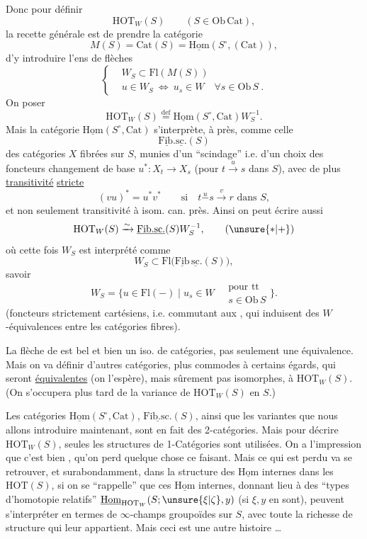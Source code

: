 Donc pour définir
\[
\mathrm{HOT}_W(S)\qquad (S\in\mathrm{Ob}\,\mathrm{Cat}),
\]
la recette générale est de prendre la catégorie
\[
M(S)=\mathrm{Cat}(S)=\underline{\mathrm{Hom}}(S^\circ,(\mathrm{Cat})),
\]
d'y introduire l'ens de flèches
\[
\left\{\begin{aligned}
&W_S\subset\mathrm{Fl}(M(S))\\
&u\in W_S\ \Longleftrightarrow\ u_s\in W\quad\forall s\in\mathrm{Ob}\,S\ .
\end{aligned}\right.
\]
On  poser
\[
\mathrm{HOT}_W(S)\overset{\mathrm{def}}{=}\underline{\mathrm{Hom}}(S^\circ,\mathrm{Cat})W_S^{-1}.
\]
Mais la catégorie $\underline{\mathrm{Hom}}(S^\circ,\mathrm{Cat})$ s'interprète,
à   près, comme celle
\[
\underline{\mathrm{Fib.}}\underline{\mathrm{sc.}}(S)
\]
des catégories $X$  fibrées sur $S$, munies
d'un ``scindage'' i.e. d'un choix des foncteurs
changement de base $u^*:X_t\longrightarrow X_s$ (pour $t\xrightarrow{u}s$
dans $S$), avec de plus \uline{transitivité} \uline{stricte}
\[
(vu)^*=u^*v^*\qquad\text{si}\quad t\mathrel{\overset{u}{-}}s\xrightarrow{v}r\text{ dans }S,
\]
et non seulement transitivité à isom. can. près.
Ainsi on peut écrire aussi
\[
\mathrm{HOT}_W(S)\xrightarrow{\sim}\underline{\mathrm{Fib.sc.}}(S)W_S^{-1},\tag*{($\unsure{*|+}$)}
\]
où cette fois $W_S$ est interprété comme
\[
W_S\subset\mathrm{Fl}\bigl(\underline{\mathrm{Fib}}\,\underline{\mathrm{sc}}.(S)\bigr),
\]
savoir
\[
W_S=\{u\in\mathrm{Fl}(-)\mid u_s\in W\quad\substack{\text{pour tt}\\s\in\mathrm{Ob}\,S}\}.
\]
(foncteurs strictement cartésiens, i.e. commutant
aux , qui induisent des $W$-équivalences
entre les catégories fibres).

La flèche de  est bel et bien un iso.
de catégories, pas seulement une équivalence.
Mais on va définir d'autres catégories, plus
commodes à certains égards, qui seront
\uline{équivalentes} (on l'espère), mais sûrement
pas isomorphes, à $\mathrm{HOT}_W(S)$. (On s'occupera
plus tard de la variance de $\mathrm{HOT}_W(S)$ en $S$.)

Les catégories $\underline{\mathrm{Hom}}(S^\circ,\mathrm{Cat})$, $\underline{\mathrm{Fib.sc.}}(S)$,
ainsi que les variantes que nous allons
introduire maintenant, sont en fait des
2-catégories. Mais pour décrire $\mathrm{HOT}_W(S)$,
seules les structures de 1-Catégories sont utilisées. On a l'impression que c'est bien
, qu'on perd quelque chose ce faisant.
Mais ce qui est perdu va se retrouver, et
surabondamment, dans la structure des
$\underline{\mathrm{Hom}}$ internes dans les $\mathrm{HOT}(S)$, si on se
``rappelle'' que ces $\underline{\mathrm{Hom}}$ internes, donnant
lieu à des ``types d'homotopie relatifs''
$\underline{\mathrm{Hom}}_{\mathrm{HOT}_W}(S;\unsure{\xi|\zeta},y)$ (si $\xi,y$ en sont), peuvent
s'interpréter en termes de $\infty$-champs  
groupoïdes sur $S$, avec toute la richesse de
structure qui leur appartient. Mais ceci est
une autre histoire \ldots

